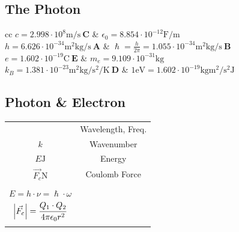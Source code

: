\documentclass[a4paper, 9pt]{extarticle}
\begin{document}
\begin{twocolumn} 

\section{The Photon}  

\begin{mtabular}{cc}
	$c = 2.998 \cdot 10^8 \si{\metre \per \second} \ \mathbf{C}$ &
	$\epsilon_0 = 8.854 \cdot 10^{-12} \si{\farad \per \meter}$ \\
	$h = 6.626 \cdot 10^{-34} \si{\metre \squared \kilogram \per \second} \ \mathbf{A}$ &
	$\hslash = \frac{h}{2\pi} = 1.055 \cdot 10^{-34}\si{\metre \squared \kilogram \per \second} \ \mathbf{B}$ \\
	$e = 1.602 \cdot 10^{-19} \si{\coulomb} \ \mathbf{E}$ &
	$m_e = 9.109 \cdot 10^{-31} \si{\kilogram}$ \\
	$k_B = 1.381 \cdot 10^{-23} \si{\metre \squared \kilogram \per \second \squared \per \kelvin} \ \mathbf{D}$ &
	$1 \si{\electronvolt} = 1.602 \cdot 10^{-19} \si{\kilogram \metre \squared \per \second \squared} \si{\joule}$ \\
\end{mtabular} 

\subsection{Photon \& Electron}

\begin{tabular}{cc}
	\begin{dtabular}
		$\lambda \si{\meter}, \, \nu\si{\per\second}$ & Wavelength, Freq. \\
		$k$ & Wavenumber \\
		$E \si{\joule}$ & Energy \\
		$\vec{F_c} \si{\newton}$ & Coulomb Force \\
	\end{dtabular} &
	\begin{mtabular}{c}
		$\fmm \lambda = \frac{c}{\nu} \quad \fmm \nu = \frac{c}{\lambda} \quad \omega = 2 \pi \nu \quad k = \frac{2 \pi \nu}{c}$ \\
		$E = h \cdot \nu = \hslash \cdot \omega$ \\
		$\displaystyle \left| \vec{F_c} \right| = \frac{Q_1 \cdot Q_2}{4 \pi \epsilon_0 r^2}$ \\
	\end{mtabular}
\end{tabular}


\end{twocolumn}
\end{document}
